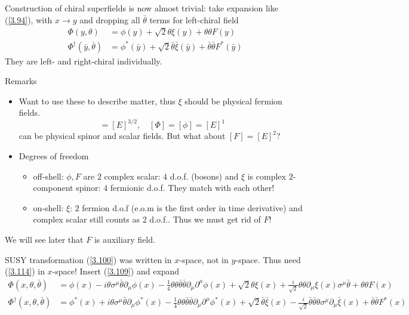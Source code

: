 Construction of chiral superfields is now almost trivial: take expansion like (\ref{3.94}), with $x \rightarrow y$ and dropping all $\bar\theta$ terms for left-chiral field
\begin{subequations}
\label{3.114}
\begin{align}
   \Phi (y, \theta) &= \phi(y) + \sqrt{2} \theta \xi(y) + \theta\theta F(y) \label{3.114a} \\
   \Phi^\dagger (\bar{y},\bar{\theta}) &= \phi^*(\bar{y}) + \sqrt{2} \bar\theta \bar\xi (\bar{y}) + \bar\theta \bar\theta F^*(\bar{y}) \label{3.114b}
\end{align}
\end{subequations}
They are left- and right-chiral individually.

Remarks
\begin{itemize}
   \item Want to use these to describe matter, thus $\xi$ should be physical fermion fields.
      \begin{equation*}
         [\xi] = [E]^{3/2}, \quad [\Phi] = [\phi] = [E]^{1}
      \end{equation*}
      can be physical spinor and scalar fields. But what about $[F] = [E]^2$?
   \item Degrees of freedom
      \begin{itemize}
         \item off-shell: $\phi, F$ are $2$ complex scalar: $4$ d.o.f. (bosons) and $\xi$ is complex $2$-component spinor: $4$ fermionic d.o.f. They match with each other!
         \item on-shell: $\xi$: $2$ fermion d.o.f (e.o.m is the first order in time derivative) and complex scalar still counts as $2$ d.o.f.. Thus we must get rid of $F$!
      \end{itemize}
\end{itemize}
We will see later that $F$ is auxiliary field.

SUSY transformation (\ref{3.100}) was written in $x$-space, not in $y$-space. Thus need (\ref{3.114}) in $x$-space! Insert (\ref{3.109}) and expand
\begin{subequations}
   \label{3.115}
\begin{align}
   \Phi (x,\theta, \bar\theta) &= \phi(x) - i\theta \sigma^\mu \bar\theta \partial_\mu \phi(x) - \frac{1}{4} \theta\theta \bar\theta \bar\theta \partial_\mu \partial^\mu \phi(x) + \sqrt{2} \theta \xi (x) + \frac{i}{\sqrt{2}} \theta\theta \partial_\mu \xi(x) \sigma^\mu \bar\theta + \theta\theta F(x) \label{3.115a} \\
   \Phi^\dagger (x,\theta,\bar\theta) &= \phi^*(x) + i\theta \sigma^\mu \bar\theta \partial_\mu \phi^*(x) - \frac{1}{4} \theta\theta\bar\theta\bar\theta \partial_\mu\partial^\mu \phi^*(x) + \sqrt{2} \bar\theta \bar\xi(x) - \frac{i}{\sqrt{2}} \bar\theta \bar\theta \theta \sigma^\mu \partial_\mu \bar\xi(x) + \bar\theta\bar\theta F^*(x) \label{3.115b}
\end{align}
\end{subequations}


